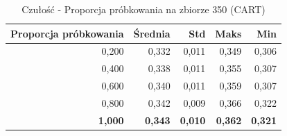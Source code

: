 \begin{table}[htbp]
\centering
\small
\setlength{\tabcolsep}{6pt}
\renewcommand{\arraystretch}{1.2}
\caption{Czułość - Proporcja próbkowania na zbiorze 350 (CART)}
\label{tab:CART_sample_ratio_350_recall}
\begin{tabular}{r|r|r|r|r}
\toprule
Proporcja próbkowania & Średnia & Std & Maks & Min \\
\hline
0,200 & 0,332 & 0,011 & 0,349 & 0,306 \\
0,400 & 0,338 & 0,011 & 0,355 & 0,307 \\
0,600 & 0,340 & 0,011 & 0,359 & 0,307 \\
0,800 & 0,342 & 0,009 & 0,366 & 0,322 \\
\textbf{1,000} & \textbf{0,343} & \textbf{0,010} & \textbf{0,362} & \textbf{0,321} \\
\bottomrule
\end{tabular}
\end{table}